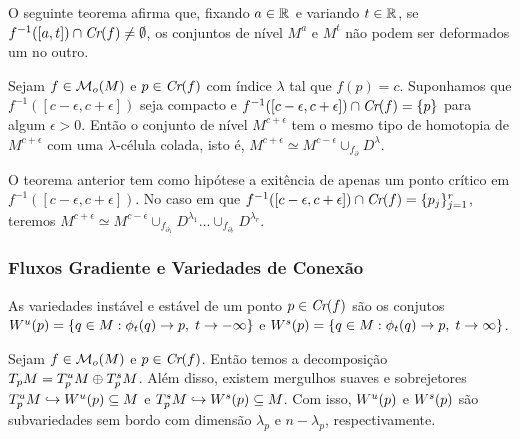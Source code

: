 \documentclass{beamer}
\begin{document}
	\begin{frame}
		O seguinte teorema afirma que, fixando $a \in \mathbb{R}^{}$ e variando $t \in \mathbb{R}^{}$, se $f^{-1}([a,t]) \cap \textit{Cr}(f) \neq \emptyset$, os conjuntos de nível $M^{a}$ e $M^{t}$ não podem ser deformados um no outro.
		
		\begin{teorema}
			Sejam $f\in \mathcal{M}_{o}(M)$ e $p\in \textit{Cr}(f)$ com índice $\lambda$ tal que $f(p) = c$. Suponhamos que $f^{-1}([c-\epsilon,c+\epsilon])$ seja compacto e $f^{-1}([c-\epsilon,c+\epsilon])\cap \textit{Cr}(f) = \{p\}$ para algum $\epsilon>0$. Então o conjunto de nível $M^{c+\epsilon}$ tem o mesmo tipo de homotopia de $M^{c+\epsilon}$ com uma $\lambda$-célula colada, isto é, $M^{c+\epsilon} \simeq M^{c-\epsilon}\cup_{f_{\partial}} D^{\lambda}$.
		\end{teorema}
		
		\pause
		\begin{observacao}
			O teorema anterior tem como hipótese a exitência de apenas um ponto crítico em $f^{-1}([c-\epsilon,c+\epsilon])$. No caso em que $f^{-1}([c-\epsilon,c+\epsilon]) \cap \textit{Cr}(f) = \{p_{j}\}_{j=1}^{r}$, teremos $M^{c+\epsilon} \simeq M^{c-\epsilon}\cup_{f_{\partial_{1}}} D^{\lambda_{1}}\dots  \cup_{f_{\partial_{r}}} D^{\lambda_{r}}$.
		\end{observacao}
	\end{frame}
	
	\begin{frame}
		
		\frametitle{Fluxos Gradiente e Variedades de Conexão}
		
		\begin{definicao}
			As variedades instável e estável de um ponto $p \in \textit{Cr}(f)$ são os conjutos $W^{u}(p) = \{q\in M: \phi_{t}(q) \to p,\; t\to -\infty\}$ e $W^{s}(p) = \{q\in M: \phi_{t}(q) \to p,\; t\to \infty\}$.
		\end{definicao}
		
		\begin{teorema}
			Sejam $f \in \mathcal{M}_{o}(M)$ e $p \in \textit{Cr}(f)$. Então temos a decomposição $T_{p}M=T^{u}_{p}M\oplus T^{s}_{p}M$. Além disso, existem mergulhos suaves e sobrejetores $T^{u}_{p}M \hookrightarrow W^{u}(p) \subseteq M$ e $T^{s}_{p}M \hookrightarrow W^{s}(p) \subseteq M$. Com isso, $W^{u}(p)$ e $W^{s}(p)$ são subvariedades sem bordo com dimensão $\lambda_{p}$ e $n-\lambda_{p}$, respectivamente.
		\end{teorema}
		
	\end{frame}
	
\end{document}
